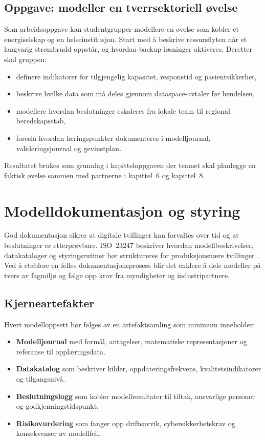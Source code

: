 \subsection{Oppgave: modeller en tverrsektoriell øvelse}
Som arbeidsoppgave kan studentgrupper modellere en øvelse som kobler et energiselskap og en helseinstitusjon. Start med å beskrive ressursflyten når et langvarig strømbrudd oppstår, og hvordan backup-løsninger aktiveres. Deretter skal gruppen:
\begin{itemize}
    \item definere indikatorer for tilgjengelig kapasitet, responstid og pasientsikkerhet,
    \item beskrive hvilke data som må deles gjennom dataspace-avtaler før hendelsen,
    \item modellere hvordan beslutninger eskaleres fra lokale team til regional beredskapsstab,
    \item foreslå hvordan læringspunkter dokumenteres i modelljournal, valideringsjournal og gevinstplan.
\end{itemize}
Resultatet brukes som grunnlag i kapitteloppgaven der teamet skal planlegge en faktisk øvelse sammen med partnerne i kapittel~6 og kapittel~8.

\section{Modelldokumentasjon og styring}
God dokumentasjon sikrer at digitale tvillinger kan forvaltes over tid og at beslutninger er etterprøvbare. ISO~23247 beskriver hvordan modellbeskrivelser, datakataloger og styringsrutiner bør struktureres for produksjonsnære tvillinger \citep{iso23247-2021}. Ved å etablere en felles dokumentasjonsprosess blir det enklere å dele modeller på tvers av fagmiljø og følge opp krav fra myndigheter og industripartnere.

\subsection{Kjerneartefakter}
Hvert modelloppsett bør følges av en artefaktsamling som minimum inneholder:
\begin{itemize}
    \item \textbf{Modelljournal} med formål, antagelser, matematiske representasjoner og referanse til opplæringsdata.
    \item \textbf{Datakatalog} som beskriver kilder, oppdateringsfrekvens, kvalitetsindikatorer og tilgangsnivå.
    \item \textbf{Beslutningslogg} som kobler modellresultater til tiltak, ansvarlige personer og godkjenningstidspunkt.
    \item \textbf{Risikovurdering} som fanger opp driftsavvik, cybersikkerhetskrav og konsekvenser av modellfeil.
\end{itemize}

